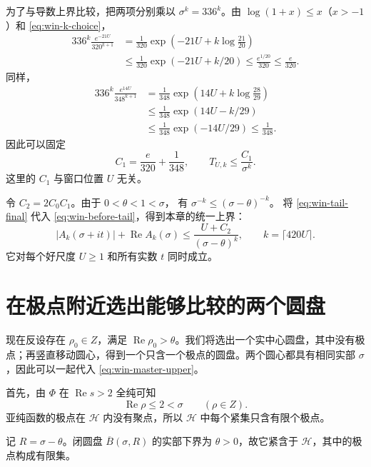 \documentclass[UTF8,fontset=fandol,a4paper,openany,oneside]{ctexbook}
\theoremstyle{definition}
\theoremstyle{remark}
\begin{document}
为了与导数上界比较，把两项分别乘以 $\sigma^k=336^k$。由
$\log(1+x)\le x$（$x>-1$）和 \eqref{eq:win-k-choice}，
\begin{align*}
 336^k\frac{e^{-21U}}{320^{k+1}}
 &=\frac1{320}
   \exp\left(-21U+k\log\frac{21}{20}\right)\\
 &\le\frac1{320}\exp(-21U+k/20)
 \le\frac{e^{1/20}}{320}
 \le\frac e{320}.
\end{align*}
同样，
\begin{align*}
 336^k\frac{e^{14U}}{348^{k+1}}
 &=\frac1{348}
   \exp\left(14U+k\log\frac{28}{29}\right)\\
 &\le\frac1{348}\exp(14U-k/29)\\
 &\le\frac1{348}\exp(-14U/29)
 \le\frac1{348}.
\end{align*}
因此可以固定
\begin{equation}
 C_1=\frac e{320}+\frac1{348},
 \qquad
 T_{U,k}\le\frac{C_1}{\sigma^k}.
 \label{eq:win-tail-final}
\end{equation}
这里的 $C_1$ 与窗口位置 $U$ 无关。

令 $C_2=2C_0C_1$。由于 $0<\theta<1<\sigma$，
有 $\sigma^{-k}\le(\sigma-\theta)^{-k}$。
将 \eqref{eq:win-tail-final} 代入
\eqref{eq:win-before-tail}，得到本章的统一上界：
\begin{equation}
 \boxed{\;
 |A_k(\sigma+it)|+\operatorname{Re}A_k(\sigma)
 \le\frac{U+C_2}{(\sigma-\theta)^k},
 \qquad k=\lceil420U\rceil.
 \;}
 \label{eq:win-master-upper}
\end{equation}
它对每个好尺度 $U\ge1$ 和所有实数 $t$ 同时成立。

\section{在极点附近选出能够比较的两个圆盘}

现在反设存在 $\rho_0\in Z$，满足
$\operatorname{Re}\rho_0>\theta$。我们将选出一个实中心圆盘，其中没有极点；再竖直移动圆心，得到一个只含一个极点的圆盘。两个圆心都具有相同实部 $\sigma$，因此可以一起代入
\eqref{eq:win-master-upper}。

首先，由 $\Phi$ 在 $\operatorname{Re}s>2$ 全纯可知
\begin{equation}
 \operatorname{Re}\rho\le2<\sigma\qquad(\rho\in Z).
 \label{eq:win-poles-left}
\end{equation}
亚纯函数的极点在 $\mathcal H$ 内没有聚点，所以 $\mathcal H$ 中每个紧集只含有限个极点。

记 $R=\sigma-\theta$。闭圆盘
$\overline B(\sigma,R)$ 的实部下界为 $\theta>0$，故它紧含于 $\mathcal H$，其中的极点构成有限集。
\end{document}
